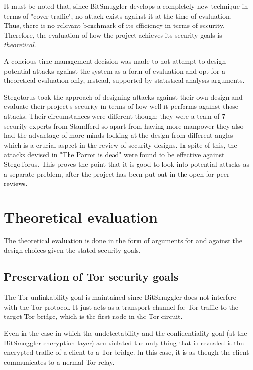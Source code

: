 \documentclass[11pt]{book} %
\newcommand{\projectName}{BitSmuggler }
\begin{document}
It must be noted that, since \projectName develops a completely new technique in terms of "cover traffic", no attack exists against it at the time of evaluation. Thus, there is no relevant benchmark of its efficiency in terms of security. Therefore, the evaluation of how the project achieves its security goals is \textit{theoretical}.

A concious time management decision was made to not attempt to design potential attacks against the system as a form of evaluation and opt for a theoretical evaluation only, instead, supported by statistical analysis arguments.

Stegotorus \citep*{stegotorus}took the approach of designing attacks against their own design and evaluate their project's security in terms of how well it performs against those attacks. Their circumstances were different though: they were a team of 7 security experts from Standford so apart from having more manpower they also had the advantage of more minds looking at the design from different angles - which is a crucial aspect in the review of security designs. In spite of this, the attacks devised in "The Parrot is dead" \citep*{deadParrot} were found to be effective against StegoTorus. This proves the point that it is good to look into potential attacks as a separate problem, after the project has been put out in the open for peer reviews.

\section{Theoretical evaluation}

The theoretical evaluation is done in the form of arguments for and against the design choices given the stated security goals.

\subsection{Preservation of Tor security goals}

The Tor unlinkability goal is maintained since \projectName does not interfere with the Tor protocol. It just acts as a transport channel for Tor traffic to the target Tor bridge, which is the first node in the Tor circuit.

Even in the case in which the undetectability and the confidentiality goal (at the \projectName encryption layer) are violated the only thing that is revealed is the encrypted traffic of a client to a Tor bridge. In this case, it is as though the client communicates to a normal Tor relay.
\end{document}

